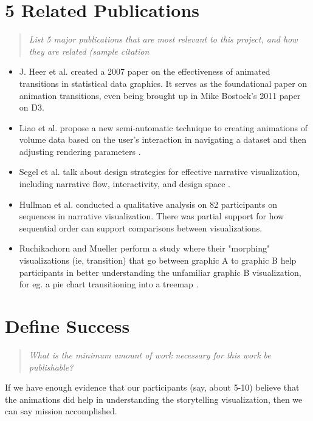 \documentclass{proc}
\begin{document}
\section{5 Related Publications}
\begin{quote}
\textit{List 5 major publications that are most relevant to this project, and how they are related (sample citation}
\end{quote}
\begin{itemize}
    \item J. Heer et al. created a 2007 paper on the effectiveness of animated transitions in statistical data graphics\cite{heerAnimated}. It serves as the foundational paper on animation transitions, even being brought up in Mike Bostock's 2011 paper on D3.
    \item Liao et al. propose a new semi-automatic technique to creating animations of volume data based on the user's interaction in navigating a dataset and then adjusting rendering parameters \cite{liaoStorytellingNavigation}. 
    \item Segel et al. talk about design strategies for effective narrative visualization, including narrative flow, interactivity, and design space \cite{segelNarrative}.
    \item Hullman et al. conducted a qualitative analysis on 82 participants on sequences in narrative visualization. There was partial support for how sequential order can support comparisons between visualizations\cite{HullmanSeqNarrative}.
    \item Ruchikachorn and Mueller perform a study where their "morphing" visualizations (ie, transition) that go between graphic A to graphic B help participants in better understanding the unfamiliar graphic B visualization, for eg. a pie chart transitioning into a treemap \cite{RuchiVisAnalogy}.
    
\end{itemize}


\section{Define Success}
\begin{quote}
\textit{What is the minimum amount of work necessary for this work be publishable?}
\end{quote}

If we have enough evidence that our participants (say, about 5-10) believe that the animations did help in understanding the storytelling visualization, then we can say mission accomplished. 



\end{document}
